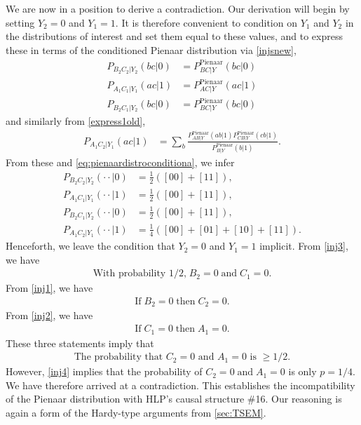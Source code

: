 \documentclass[aps,english,10pt,superscriptaddress,onecolumn,twoside,longbibliography,pra,floatfix,fleqn,nofootinbib]{revtex4-1}
\theoremstyle{definition}
\begin{document}
We are now in a position to derive a contradiction.  
Our derivation will begin by setting $Y_2=0$ and $Y_1=1$.  It is therefore convenient to condition on $Y_1$ and $Y_2$ in the distributions of interest and set them equal to these values, and to express these in terms of the conditioned Pienaar distribution via \cref{injsnew},
\begin{align}
P_{B_2 C_2 |Y_2}(bc| 0)&= P^{\text{Pienaar}}_{BC|Y}(bc|0) \nonumber\\
P_{A_1 C_1  |Y_1}(ac|1)&= P^{\text{Pienaar}}_{AC|Y}(ac|1)\nonumber\\
P_{B_2 C_1 |Y_2}(bc|0)&= P^{\text{Pienaar}}_{BC|Y}(bc|0) 
\end{align} 
and similarly from \cref{express1old},
\begin{align}
P_{A_1 C_2 |Y_1}(ac|1)  &=\sum_{b} \frac{P^{\text{Pienaar}}_{A B |Y}(a b| 1) P^{\text{Pienaar}}_{C B| Y}(c b |1) }{P^{\text{Pienaar}}_{B |Y}(b |1)}.
\end{align}
From these and \cref{eq:pienaardistroconditiona}, we infer
\begin{align}
P_{B_2 C_2 |Y_2}(\cdot \cdot| 0)&=  \frac{1}{2}([00]+[11]),\label{inj1}\\
P_{A_1 C_1  |Y_1}(\cdot \cdot| 1)&=  \frac{1}{2}([00]+[11]), \label{inj2}\\
P_{B_2 C_1 |Y_2}(\cdot \cdot| 0)&=  \frac{1}{2}([00]+[11]),\label{inj3} \\
P_{A_1 C_2 |Y_1}(\cdot \cdot|1)  &=  \frac{1}{4}([00]+[01]+[10]+[11]).\label{inj4}
\end{align} 
Henceforth, we leave the condition that $Y_2=0$ and $Y_1=1$ implicit.  
From \cref{inj3}, we have 
\begin{align}
\text{With probability 1/2,}\; B_2=0\; \text{and}\;C_1=0.
\end{align}
From \cref{inj1}, we have
\begin{align}
\text{If}\; B_2=0\; \text{then}\;C_2=0.
\end{align}
From \cref{inj2}, we have
\begin{align}
\text{If}\; C_1=0\; \text{then}\;A_1=0.
\end{align}
These three statements imply that 
\begin{align}
\text{The probability that } C_2=0 \text{ and } A_1=0 \text{ is } \ge 1/2.
\end{align}
However, \cref{inj4} implies that the probability of $C_2=0\; \text{and}\;A_1=0$ is only $p=1/4$.  
We have therefore arrived at a contradiction.  This establishes the incompatibility of the Pienaar distribution with HLP's causal structure \#16. Our reasoning is again a form of the Hardy-type arguments from \cref{sec:TSEM}.
\end{document}
